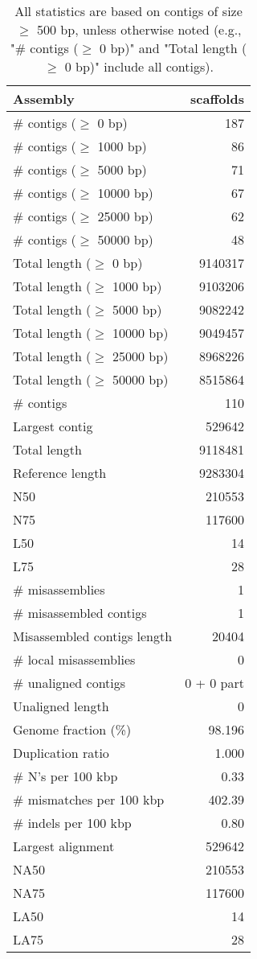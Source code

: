 \documentclass[12pt,a4paper]{article}
\begin{document}
\begin{table}[ht]
\begin{center}
\caption{All statistics are based on contigs of size $\geq$ 500 bp, unless otherwise noted (e.g., "\# contigs ($\geq$ 0 bp)" and "Total length ($\geq$ 0 bp)" include all contigs).}
\begin{tabular}{|l*{1}{|r}|}
\hline
Assembly & scaffolds \\ \hline
\# contigs ($\geq$ 0 bp) & 187 \\ \hline
\# contigs ($\geq$ 1000 bp) & 86 \\ \hline
\# contigs ($\geq$ 5000 bp) & 71 \\ \hline
\# contigs ($\geq$ 10000 bp) & 67 \\ \hline
\# contigs ($\geq$ 25000 bp) & 62 \\ \hline
\# contigs ($\geq$ 50000 bp) & 48 \\ \hline
Total length ($\geq$ 0 bp) & 9140317 \\ \hline
Total length ($\geq$ 1000 bp) & 9103206 \\ \hline
Total length ($\geq$ 5000 bp) & 9082242 \\ \hline
Total length ($\geq$ 10000 bp) & 9049457 \\ \hline
Total length ($\geq$ 25000 bp) & 8968226 \\ \hline
Total length ($\geq$ 50000 bp) & 8515864 \\ \hline
\# contigs & 110 \\ \hline
Largest contig & 529642 \\ \hline
Total length & 9118481 \\ \hline
Reference length & 9283304 \\ \hline
N50 & 210553 \\ \hline
N75 & 117600 \\ \hline
L50 & 14 \\ \hline
L75 & 28 \\ \hline
\# misassemblies & 1 \\ \hline
\# misassembled contigs & 1 \\ \hline
Misassembled contigs length & 20404 \\ \hline
\# local misassemblies & 0 \\ \hline
\# unaligned contigs & 0 + 0 part \\ \hline
Unaligned length & 0 \\ \hline
Genome fraction (\%) & 98.196 \\ \hline
Duplication ratio & 1.000 \\ \hline
\# N's per 100 kbp & 0.33 \\ \hline
\# mismatches per 100 kbp & 402.39 \\ \hline
\# indels per 100 kbp & 0.80 \\ \hline
Largest alignment & 529642 \\ \hline
NA50 & 210553 \\ \hline
NA75 & 117600 \\ \hline
LA50 & 14 \\ \hline
LA75 & 28 \\ \hline
\end{tabular}
\end{center}
\end{table}
\end{document}
